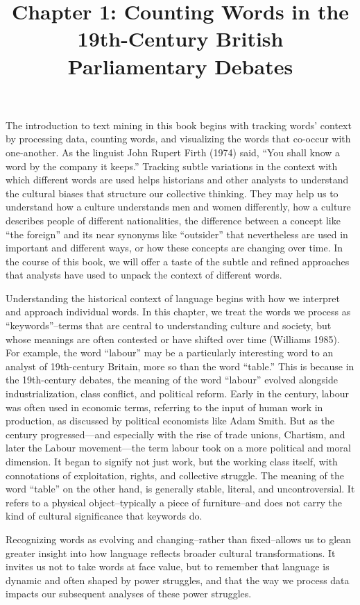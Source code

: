 \documentclass[
]{article}
\title{Chapter 1: Counting Words in the 19th-Century British
Parliamentary Debates}
\author{}
\date{\vspace{-2.5em}}
\newcounter{chapter}
\begin{document}
\maketitle

The introduction to text mining in this book begins with tracking words'
context by processing data, counting words, and visualizing the words
that co-occur with one-another. As the linguist John Rupert Firth (1974)
said, ``You shall know a word by the company it keeps.'' Tracking subtle
variations in the context with which different words are used helps
historians and other analysts to understand the cultural biases that
structure our collective thinking. They may help us to understand how a
culture understands men and women differently, how a culture describes
people of different nationalities, the difference between a concept like
``the foreign'' and its near synonyms like ``outsider'' that
nevertheless are used in important and different ways, or how these
concepts are changing over time. In the course of this book, we will
offer a taste of the subtle and refined approaches that analysts have
used to unpack the context of different words.

Understanding the historical context of language begins with how we
interpret and approach individual words. In this chapter, we treat the
words we process as ``keywords''--terms that are central to
understanding culture and society, but whose meanings are often
contested or have shifted over time (Williams 1985). For example, the
word ``labour'' may be a particularly interesting word to an analyst of
19th-century Britain, more so than the word ``table.'' This is because
in the 19th-century debates, the meaning of the word ``labour'' evolved
alongside industrialization, class conflict, and political reform. Early
in the century, labour was often used in economic terms, referring to
the input of human work in production, as discussed by political
economists like Adam Smith. But as the century progressed---and
especially with the rise of trade unions, Chartism, and later the Labour
movement---the term labour took on a more political and moral dimension.
It began to signify not just work, but the working class itself, with
connotations of exploitation, rights, and collective struggle. The
meaning of the word ``table'' on the other hand, is generally stable,
literal, and uncontroversial. It refers to a physical object--typically
a piece of furniture--and does not carry the kind of cultural
significance that keywords do.

Recognizing words as evolving and changing--rather than fixed--allows us
to glean greater insight into how language reflects broader cultural
transformations. It invites us not to take words at face value, but to
remember that language is dynamic and often shaped by power struggles,
and that the way we process data impacts our subsequent analyses of
these power struggles.
\end{document}
